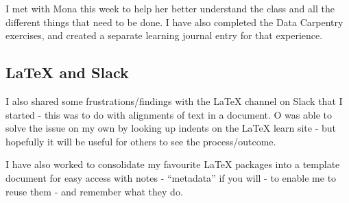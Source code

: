 \documentclass{article}
\begin{document}
I met with Mona this week to help her better understand the class and all the different things that need to be done. I have also completed the Data Carpentry exercises, and created a separate learning journal entry for that experience. 

\subsection{LaTeX and Slack}
\label{ LaTeX Alignment}
I also shared some frustrations/findings with the LaTeX channel on Slack that I started - this was to do with alignments of text in a document. O was able to solve the issue on my own by looking up indents on the LaTeX learn site - but hopefully it will be useful for others to see the process/outcome.

I have also worked to consolidate my favourite LaTeX packages into a template document for easy access with notes - ``metadata'' if you will - to enable me to reuse them - and remember what they do. 
\end{document}
